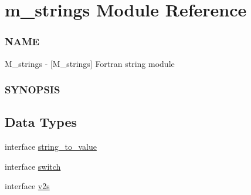 \hypertarget{namespacem__strings}{}\section{m\+\_\+strings Module Reference}
\label{namespacem__strings}


\subsubsection*{N\+A\+ME}

M\+\_\+strings -\/ \mbox{[}M\+\_\+strings\mbox{]} Fortran string module \subsubsection*{S\+Y\+N\+O\+P\+S\+IS} 


\subsection*{Data Types}
\begin{DoxyCompactItemize}
\item 
interface \hyperlink{interfacem__strings_1_1string__to__value}{string\+\_\+to\+\_\+value}
\item 
interface \hyperlink{interfacem__strings_1_1switch}{switch}
\item 
interface \hyperlink{interfacem__strings_1_1v2s}{v2s}
\end{DoxyCompactItemize}
